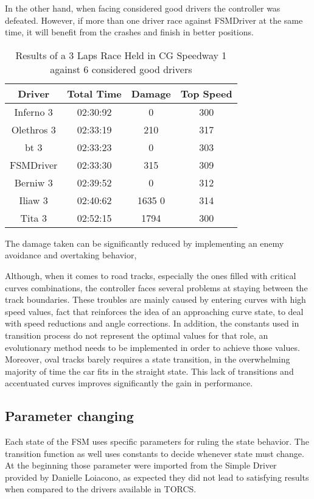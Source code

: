 In the other hand, when facing considered good drivers the controller was defeated. However, if more than one driver race against FSMDriver at the same time, it will benefit from the crashes and finish in better positions.

\begin{table}[h]
\renewcommand{\arraystretch}{1.3}
\caption{Results of a 3 Laps Race Held in CG Speedway 1 against 6 considered good drivers}
\label{table_4}
\centering
\begin{tabular}{c||c||c||c}
\hline  \bfseries Driver & \bfseries Total Time & \bfseries  Damage & \bfseries Top Speed \\ 
\hline Inferno 3 & 02:30:92 & 0 & 300 \\ 
\hline Olethros 3 & 02:33:19 & 210 & 317 \\  
\hline bt 3 & 02:33:23 & 0 & 303 \\  
\hline FSMDriver & 02:33:30 & 315 & 309 \\  
\hline Berniw 3 & 02:39:52 & 0 & 312 \\
\hline Iliaw 3 & 02:40:62 & 1635 0 & 314 \\
\hline Tita 3 & 02:52:15 & 1794 & 300 \\
\hline 
\end{tabular}
\end{table} 


The damage taken can be significantly reduced by implementing an enemy avoidance and overtaking behavior,

Although, when it comes to road tracks, especially the ones filled with critical curves combinations, the controller faces several problems at staying between the track boundaries. These troubles are mainly caused by entering curves with high speed values, fact that reinforces the idea of an approaching curve state, to deal with speed reductions and angle corrections. In addition, the constants used in transition process do not represent the optimal values for that role, an evolutionary method needs to be implemented in order to achieve those values. Moreover, oval tracks barely requires a state transition, in the overwhelming majority of time the car fits in the straight state. This lack of transitions and accentuated curves improves significantly the gain in performance.

\subsection{Parameter changing}
Each state of the FSM uses specific parameters for ruling the state behavior. The transition function as well uses constants to decide whenever state must change. At the beginning those parameter were imported from the Simple Driver provided by Danielle Loiacono, as expected they did not lead to satisfying results when compared to the drivers available in TORCS.

